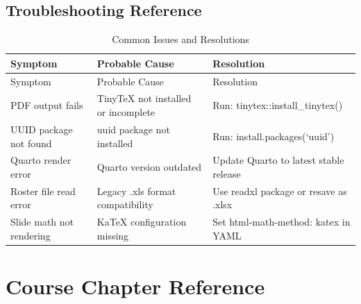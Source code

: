 \documentclass[
]{article}
\begin{document}
\subsection{Troubleshooting Reference}\label{troubleshooting-reference}

\begin{longtable}[]{@{}
  >{\raggedright\arraybackslash}p{}
  >{\raggedright\arraybackslash}p{}
  >{\raggedright\arraybackslash}p{}@{}}
\caption{Common Issues and Resolutions}\tabularnewline
\toprule\noalign{}
\begin{minipage}[b]{\linewidth}\raggedright
Symptom
\end{minipage} & \begin{minipage}[b]{\linewidth}\raggedright
Probable Cause
\end{minipage} & \begin{minipage}[b]{\linewidth}\raggedright
Resolution
\end{minipage} \\
\midrule\noalign{}
\endfirsthead
\toprule\noalign{}
\begin{minipage}[b]{\linewidth}\raggedright
Symptom
\end{minipage} & \begin{minipage}[b]{\linewidth}\raggedright
Probable Cause
\end{minipage} & \begin{minipage}[b]{\linewidth}\raggedright
Resolution
\end{minipage} \\
\midrule\noalign{}
\endhead
\bottomrule\noalign{}
\endlastfoot
PDF output fails & TinyTeX not installed or incomplete & Run:
tinytex::install\_tinytex() \\
UUID package not found & uuid package not installed & Run:
install.packages(`uuid') \\
Quarto render error & Quarto version outdated & Update Quarto to latest
stable release \\
Roster file read error & Legacy .xls format compatibility & Use readxl
package or resave as .xlsx \\
Slide math not rendering & KaTeX configuration missing & Set
html-math-method: katex in YAML \\
\end{longtable}

\newpage

\section{Course Chapter Reference}\label{course-chapter-reference}
\end{document}
